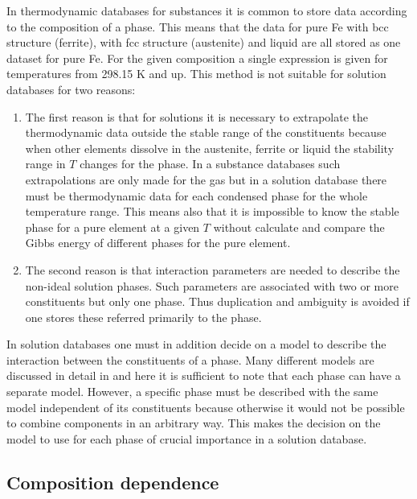 \documentclass[12pt]{article}
\begin{document}
In thermodynamic databases for substances it is common to store data
according to the composition of a phase.  This means that the data for
pure Fe with bcc structure (ferrite), with fcc structure (austenite)
and liquid are all stored as one dataset for pure Fe.  For the given
composition a single expression is given for temperatures from 298.15
K and up.  This method is not suitable for solution databases for two
reasons:
\begin{enumerate}
\item The first reason is that for solutions it is necessary to
  extrapolate the thermodynamic data outside the stable range of the
  constituents because when other elements dissolve in the austenite,
  ferrite or liquid the stability range in $T$ changes for the phase.
  In a substance databases such extrapolations are only made for the
  gas but in a solution database there must be thermodynamic data for
  each condensed phase for the whole temperature range.  This means
  also that it is impossible to know the stable phase for a pure
  element at a given $T$ without calculate and compare the Gibbs
  energy of different phases for the pure element.

\item The second reason is that interaction parameters are needed to
  describe the non-ideal solution phases.  Such parameters
  are associated with two or more constituents but only one phase.
  Thus duplication and ambiguity is avoided if one stores these
  referred primarily to the phase.
\end{enumerate}

In solution databases one must in addition decide on a model to
describe the interaction between the constituents of a phase.  Many
different models are discussed in detail in \cite{07Luk} and here it
is sufficient to note that each phase can have a separate model.
However, a specific phase must be described with the same model
independent of its constituents because otherwise it would not be
possible to combine components in an arbitrary way.  This makes the
decision on the model to use for each phase of crucial importance in a
solution database.

\subsection{Composition dependence}\label{sec:tpdep}
\end{document}
